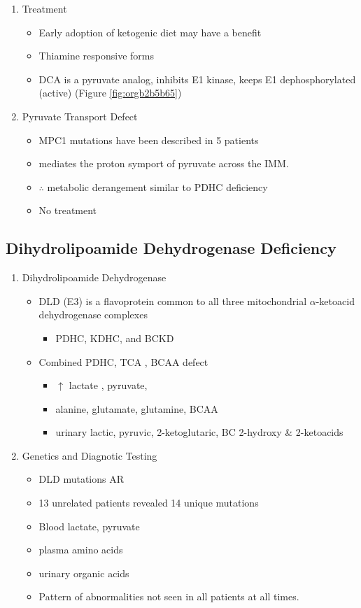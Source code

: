 \documentclass{scrartcl}
\begin{document}
\begin{enumerate}
\item Treatment
\label{sec:org0ea0e91}
\begin{itemize}
\item Early adoption of ketogenic diet may have a benefit
\item Thiamine responsive forms
\item DCA is a pyruvate analog, inhibits E1 kinase, keeps E1 dephosphorylated (active) (Figure \ref{fig:orgb2b5b65})
\end{itemize}

\item Pyruvate Transport Defect
\label{sec:orgf0b1744}
\begin{itemize}
\item MPC1 mutations have been described in 5 patients
\item mediates the proton symport of pyruvate across the IMM.
\item \(\therefore\) metabolic derangement similar to PDHC deficiency
\item No treatment
\end{itemize}
\end{enumerate}

\subsection{Dihydrolipoamide Dehydrogenase Deficiency}
\label{sec:org5ce8265}
\begin{enumerate}
\item Dihydrolipoamide Dehydrogenase
\label{sec:orgd9c7265}
\begin{itemize}
\item DLD (E3) is a flavoprotein common to all three mitochondrial
\(\alpha\)-ketoacid dehydrogenase complexes
\begin{itemize}
\item PDHC, KDHC, and BCKD
\end{itemize}
\item Combined PDHC, TCA , BCAA defect
\begin{itemize}
\item \(\uparrow\) lactate , pyruvate,
\item alanine, glutamate, glutamine, BCAA
\item urinary lactic, pyruvic, 2-ketoglutaric, BC 2-hydroxy \& 2-ketoacids
\end{itemize}
\end{itemize}

\item Genetics and Diagnotic Testing
\label{sec:org9ffbb80}
\begin{itemize}
\item DLD mutations AR
\item 13 unrelated patients revealed 14 unique mutations
\item Blood lactate, pyruvate
\item plasma amino acids
\item urinary organic acids
\item Pattern of abnormalities not seen in all patients at all times.
\end{itemize}
\end{enumerate}
\end{document}
